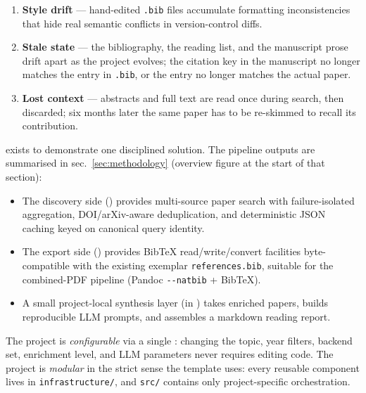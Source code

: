 \documentclass[
  english,
]{article}
\providecommand{\tightlist}{%
  \setlength{\itemsep}{0pt}\setlength{\parskip}{0pt}}
\begin{document}
\begin{enumerate}
\def\labelenumi{\arabic{enumi}.}
\tightlist
\item
  \textbf{Style drift} --- hand-edited \texttt{.bib} files accumulate
  formatting inconsistencies that hide real semantic conflicts in
  version-control diffs.
\item
  \textbf{Stale state} --- the bibliography, the reading list, and the
  manuscript prose drift apart as the project evolves; the citation key
  in the manuscript no longer matches the entry in \texttt{.bib}, or the
  entry no longer matches the actual paper.
\item
  \textbf{Lost context} --- abstracts and full text are read once during
  search, then discarded; six months later the same paper has to be
  re-skimmed to recall its contribution.
\end{enumerate}

 exists to demonstrate one disciplined
solution. The pipeline outputs are summarised in
sec.~\ref{sec:methodology} (overview figure at the start of that
section):

\begin{itemize}
\tightlist
\item
  The discovery side
  (\href{../../../../infrastructure/search/}{})
  provides multi-source paper search with failure-isolated aggregation,
  DOI/arXiv-aware deduplication, and deterministic JSON caching keyed on
  canonical query identity.
\item
  The export side
  (\href{../../../../infrastructure/reference/}{})
  provides BibTeX read/write/convert facilities byte-compatible with the
  existing exemplar \texttt{references.bib}, suitable for the
  combined-PDF pipeline (Pandoc \texttt{-\/-natbib} + BibTeX).
\item
  A small project-local synthesis layer (in
  \href{../src/synthesis.py}{}) takes enriched
  papers, builds reproducible LLM prompts, and assembles a markdown
  reading report.
\end{itemize}

The project is \emph{configurable} via a single
: changing the topic, year filters,
backend set, enrichment level, and LLM parameters never requires editing
code. The project is \emph{modular} in the strict sense the template
uses: every reusable component lives in \texttt{infrastructure/}, and
\texttt{src/} contains only project-specific orchestration.
\end{document}
